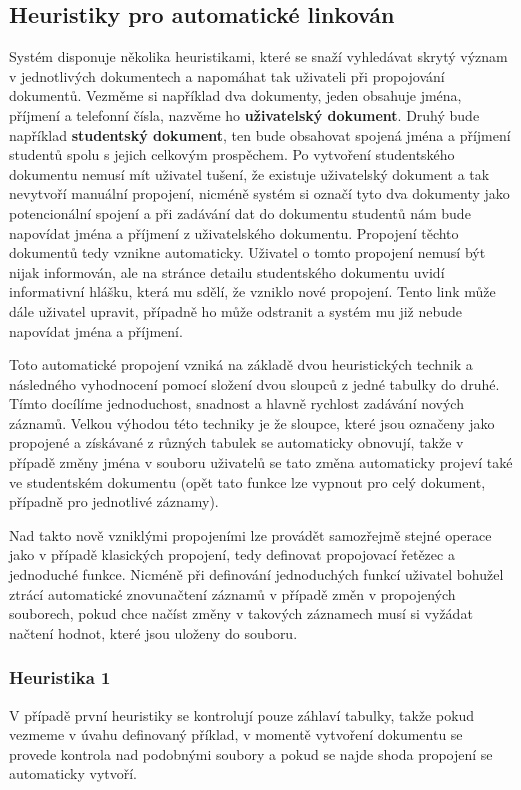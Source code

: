\subsection{Heuristiky pro automatické linkován}
\par Systém disponuje několika heuristikami, které se snaží vyhledávat skrytý význam v jednotlivých dokumentech a napomáhat tak uživateli při propojování dokumentů. Vezměme si například dva dokumenty, jeden obsahuje jména, příjmení a telefonní čísla, nazvěme ho \textbf{uživatelský dokument}. Druhý bude například \textbf{studentský dokument}, ten bude obsahovat spojená jména a příjmení studentů spolu s jejich celkovým prospěchem. Po vytvoření studentského dokumentu nemusí mít uživatel tušení, že existuje uživatelský dokument a tak nevytvoří manuální propojení, nicméně systém si označí tyto dva dokumenty jako potencionální spojení a při zadávání dat do dokumentu studentů nám bude napovídat jména a příjmení z uživatelského dokumentu. Propojení těchto dokumentů tedy vznikne automaticky. Uživatel o tomto propojení nemusí být nijak informován, ale na stránce detailu studentského dokumentu uvidí informativní hlášku, která mu sdělí, že vzniklo nové propojení. Tento link může dále uživatel upravit, případně ho může odstranit a systém mu již nebude napovídat jména a příjmení.

\par Toto automatické propojení vzniká na základě dvou heuristických technik a následného vyhodnocení pomocí složení dvou sloupců z jedné tabulky do druhé. Tímto docílíme jednoduchost, snadnost a hlavně rychlost zadávání nových záznamů. Velkou výhodou této techniky je že sloupce, které jsou označeny jako propojené a získávané z různých tabulek se automaticky obnovují, takže v případě změny jména v souboru uživatelů se tato změna automaticky projeví také ve studentském dokumentu (opět tato funkce lze vypnout pro celý dokument, případně pro jednotlivé záznamy).

\par Nad takto nově vzniklými propojeními lze provádět samozřejmě stejné operace jako v případě klasických propojení, tedy definovat propojovací řetězec a jednoduché funkce. Nicméně při definování jednoduchých funkcí uživatel bohužel ztrácí automatické znovunačtení záznamů v případě změn v propojených souborech, pokud chce načíst změny v takových záznamech musí si vyžádat načtení hodnot, které jsou uloženy do souboru.

\subsubsection{Heuristika 1}
\par V případě první heuristiky se kontrolují pouze záhlaví tabulky, takže pokud vezmeme v úvahu definovaný příklad, v momentě vytvoření dokumentu se provede kontrola nad podobnými soubory a pokud se najde shoda propojení se automaticky vytvoří.
